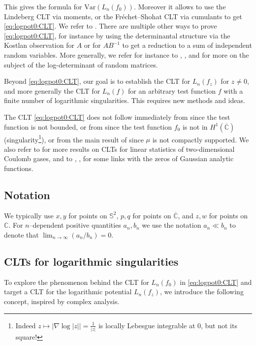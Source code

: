 \documentclass[10pt,reqno]{amsart}
\numberwithin{equation}{section}
\numberwithin{figure}{section}
\theoremstyle{plain}
\newcommand{\<}{\langle}
\renewcommand{\>}{\rangle}
\begin{document}
This gives the formula for $\mathrm{Var}(L_n(f_0))$. Moreover it allows to use the Lindeberg CLT via moments, or the Fréchet--Shohat CLT via cumulants to get \eqref{eq:logpot0:CLT}. We refer to \cite[Prop.~2.1 and Th.~3.3]{zbMATH05547558}. 
There are multiple other ways to prove \eqref{eq:logpot0:CLT}, for
instance by using the determinantal structure via the Kostlan observation for $A$ or for $AB^{-1}$ to get a reduction to a sum of independent random variables. 
%
%
More generally, we refer for instance to \cite{zbMATH01191059}, \cite{zbMATH06265853}, and \cite{MR3352055} for more on the subject of the log-determinant of random matrices.

Beyond \eqref{eq:logpot0:CLT}, our goal is to establish the CLT for $L_n(f_z)$ for $z\neq0$, and more generally the CLT for $L_n(f)$ for an arbitrary test function $f$ with a finite number of logarithmic singularities. This requires new methods and ideas.

%

The CLT \eqref{eq:logpot0:CLT} does not follow immediately from \cite{PhysRevLett.75.69,MR1894104} since the test function is not bounded, or from \cite{MR2346510,MR4721731,zbMATH06113080,bourgoin} since the test function $f_0$ is not in $H^1(\overline{\mathbb{C}})$ (singularity\footnote{Indeed $z\mapsto|\nabla\log|z||=\frac{1}{|z|}$ is locally Lebesgue integrable at $0$, but not its square!}), or from the main result of \cite{MR3788208,zbMATH07654445,zbMATH08155333,bourgadeetal} since $\mu$ is not compactly supported. We also refer to \cite{MR2361453,zbMATH07431029,MR2817648,MR4552960,zbMATH08155333} for more results on CLTs for linear statistics of two-dimensional Coulomb gases, and to \cite{MR2552864}, \cite{zbMATH06340358}, \cite{MR4408512} for some links with the zeros of Gaussian analytic functions. 

\subsection{Notation} 
\label{sub:notation} We typically use $x,y$ for points on $\mathbb{S}^2$,
$p,q$ for points on $\overline{\mathbb{C}}$, and $z,w$ for points on $\mathbb{C}$. For $n$--dependent positive
quantities $a_n,b_n$ we use the notation $a_n\ll b_n$ to denote that $\lim_{n\to\infty} (a_n/b_n)=0$. 

\subsection{CLTs for logarithmic singularities}
To explore the phenomenon behind the CLT for $L_n(f_0)$ in \eqref{eq:logpot0:CLT} and target a CLT for the logarithmic potential $L_n(f_z)$, we introduce the following concept, inspired by complex analysis.
\end{document}
